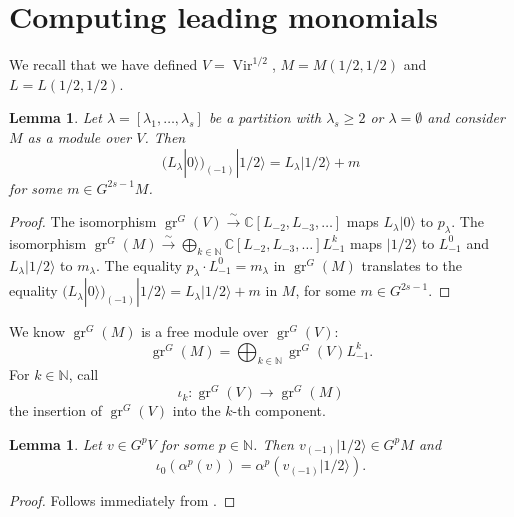 \documentclass[12pt, reqno]{amsart}
\newtheorem{lemma}[theorem]{Lemma}
\theoremstyle{remark}
\DeclareMathOperator{\Vir}{Vir}
\DeclareMathOperator{\gr}{gr}
\newcommand{\vac}{|0\rangle}
\newcommand{\vachalf}{|1/2\rangle}
\begin{document}
\section{Computing leading monomials}
\label{sec:comp-lead-monom}

We recall that we have defined $V = \Vir^{1/2}$, $M = M(1/2, 1/2)$ and $L = L(1/2, 1/2)$.

\begin{lemma}
  \label{lmm:7}
  Let $\lambda = [\lambda_1, \dots, \lambda_s]$ be a partition with $\lambda_s \ge 2$ or $\lambda = \emptyset$ and consider $M$ as a module over $V$.
  Then
  \begin{equation*}
    (L_\lambda\vac)_{(-1)}\vachalf = L_\lambda\vachalf + m
  \end{equation*}
  for some $m \in G^{2s - 1}M$.
\end{lemma}

\begin{proof}
  The isomorphism $\gr^G(V) \xrightarrow{\sim} \mathbb{C}[L_{-2}, L_{-3}, \dots]$ maps $L_\lambda\vac$ to $p_\lambda$.
  The isomorphism $\gr^G(M) \xrightarrow{\sim} \bigoplus_{k \in \mathbb{N}}\mathbb{C}[L_{-2}, L_{-3}, \dots]L_{-1}^k$ maps $\vachalf$ to $L_{-1}^0$ and $L_\lambda\vachalf$ to $m_\lambda$.
  The equality $p_\lambda\cdot L_{-1}^0 = m_\lambda$ in $\gr^G(M)$ translates to the equality $(L_\lambda\vac)_{(-1)}\vachalf = L_\lambda\vachalf + m$ in $M$, for some $m \in G^{2s - 1}$.
\end{proof}

We know $\gr^G(M)$ is a free module over $\gr^G(V)$:
\begin{equation*}
  \gr^G(M) = \bigoplus_{k \in \mathbb{N}}\gr^G(V)L_{-1}^k.
\end{equation*}
For $k \in \mathbb{N}$, call
\begin{equation*}
  \iota_k: \gr^G(V) \to \gr^G(M)
\end{equation*}
the insertion of $\gr^G(V)$ into the $k$-th component.

\begin{lemma}
  \label{lmm:8}
  Let $v \in G^pV$ for some $p \in \mathbb{N}$.
  Then $v_{(-1)}\vachalf \in G^pM$ and
  \begin{equation*}
    \iota_0(\alpha^p(v)) = \alpha^p(v_{(-1)}\vachalf).
  \end{equation*}
\end{lemma}

\begin{proof}
  Follows immediately from .
\end{proof}
\end{document}
